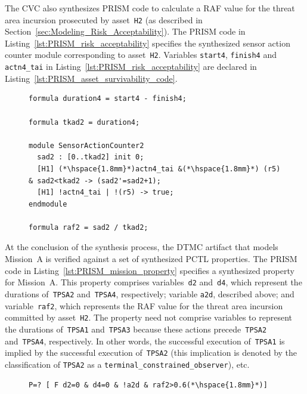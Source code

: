 The CVC also synthesizes PRISM code to calculate a RAF value for the threat area incursion prosecuted by asset~\texttt{H2} (as described in Section~\ref{sec:Modeling_Risk_Acceptability}). The PRISM code in Listing~\ref{lst:PRISM_risk_acceptability} specifies the synthesized sensor action counter module corresponding to asset~\texttt{H2}. Variables \texttt{start4}, \texttt{finish4} and \texttt{actn4\_tai} in Listing~\ref{lst:PRISM_risk_acceptability} are declared in Listing~\ref{lst:PRISM_asset_survivability_code}.

\begin{figure}[ht]
\begin{lstlisting}[caption={PRISM risk acceptability code},label=lst:PRISM_risk_acceptability]
formula duration4 = start4 - finish4;

formula tkad2 = duration4;

module SensorActionCounter2
  sad2 : [0..tkad2] init 0;
  [H1] (*\hspace{1.8mm}*)actn4_tai &(*\hspace{1.8mm}*) (r5) & sad2<tkad2 -> (sad2'=sad2+1);
  [H1] !actn4_tai | !(r5) -> true;
endmodule

formula raf2 = sad2 / tkad2;
\end{lstlisting}
\end{figure}

At the conclusion of the synthesis process, the DTMC artifact that models Mission~A is verified against a set of synthesized PCTL properties. The PRISM code in Listing~\ref{lst:PRISM_mission_property} specifies a synthesized property for Mission~A\@. This property comprises variables~\texttt{d2} and~\texttt{d4}, which represent the durations of~\texttt{TPSA2} and~\texttt{TPSA4}, respectively; variable \texttt{a2d}, described above; and variable~\texttt{raf2}, which represents the RAF value for the threat area incursion committed by asset~\texttt{H2}. The property need not comprise variables to represent the durations of~\texttt{TPSA1} and~\texttt{TPSA3} because these actions precede~\texttt{TPSA2} and~\texttt{TPSA4}, respectively. In other words, the successful execution of~\texttt{TPSA1} is implied by the successful execution of~\texttt{TPSA2} (this implication is denoted by the classification of \texttt{TPSA2} as a \texttt{terminal\_constrained\_observer}), etc.

\begin{figure}[ht]
\begin{lstlisting}[caption={PRISM mission property code},label=lst:PRISM_mission_property]
P=? [ F d2=0 & d4=0 & !a2d & raf2>0.6(*\hspace{1.8mm}*)]
\end{lstlisting}
\end{figure}

